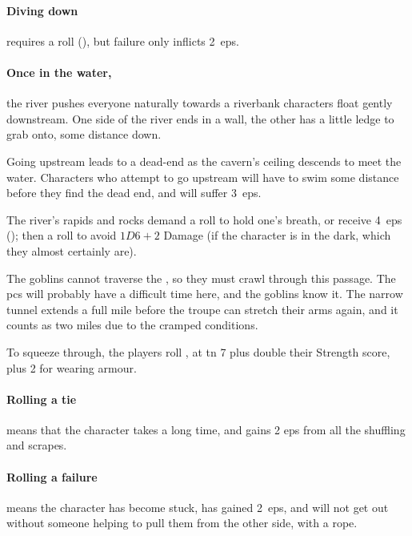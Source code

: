 \begin{multicols}{2}
\paragraph{Diving down}
requires a  roll (\tn[10]), but failure only inflicts 2~\glspl{ep}.

\paragraph{Once in the water,}
the river pushes everyone naturally towards a riverbank
characters float gently downstream.
One side of the river ends in a wall, the other has a little ledge to grab onto, some distance down.

Going upstream leads to a dead-end as the cavern's ceiling descends to meet the water.
Characters who attempt to go upstream will have to swim some distance before they find the dead end, and will suffer 3~\glspl{ep}.



The river's rapids and rocks demand a  roll to hold one's breath, or receive 4~\glspl{ep} (\tn[10]); then a  roll to avoid $1D6+2$ Damage (\tn[16] if the character is in the dark, which they almost certainly are).


The goblins cannot traverse the , so they must crawl through this passage.
The \glspl{pc} will probably have a difficult time here, and the goblins know it.
The narrow tunnel extends a full mile before the troupe can stretch their arms again, and it counts as two miles due to the cramped conditions.

To squeeze through, the players roll , at \gls{tn} 7 plus double their Strength score, plus 2 for wearing armour.

\paragraph{Rolling a tie}
means that the character takes a long time, and gains 2 \glspl{ep} from all the shuffling and scrapes.

\paragraph{Rolling a failure}
means the character has become stuck, has gained 2~\glspl{ep}, and will not get out without someone helping to pull them from the other side, with a rope.


\end{multicols}
